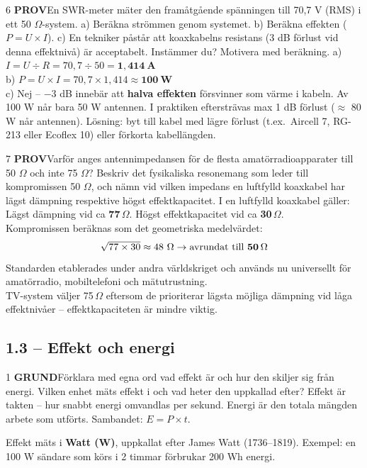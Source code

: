 \documentclass[a4paper,11pt,twoside]{book}
\newcommand{\qgrund}{\colorbox{greenpale}{\textcolor{greendark}{\headingfont\bfseries\tiny GRUND}}}
\newcommand{\qprov}{\colorbox{redpale}{\textcolor{reddark}{\headingfont\bfseries\tiny PROV}}}
\begin{document}
\begin{facitblock}{6}
\qprov\quad En SWR-meter mäter den framåtgående spänningen till 70,7 V 
(RMS) i ett 50 $\Omega$-system. a) Beräkna strömmen genom systemet. 
b) Beräkna effekten ($P = U \times I$). c) En tekniker påstår att 
koaxkabelns resistans (3 dB förlust vid denna effektnivå) är 
acceptabelt. Instämmer du? Motivera med beräkning.
\tcblower
a) $I = U \div R = 70{,}7 \div 50 = \mathbf{1{,}414\ \text{A}}$\\
b) $P = U \times I = 70{,}7 \times 1{,}414 \approx \mathbf{100\ \text{W}}$\\
c) Nej – $-3$ dB innebär att \textbf{halva effekten} försvinner som 
värme i kabeln. Av 100 W når bara 50 W antennen. I praktiken eftersträvas 
max 1 dB förlust ($\approx$ 80 W når antennen). Lösning: byt till kabel 
med lägre förlust (t.ex.\ Aircell 7, RG-213 eller Ecoflex 10) eller 
förkorta kabellängden.
\end{facitblock}

\newpage

\begin{facitblock}{7}
\qprov\quad Varför anges antennimpedansen för de flesta 
amatörradioapparater till 50 $\Omega$ och inte 75 $\Omega$? Beskriv 
det fysikaliska resonemang som leder till kompromissen 50 $\Omega$, 
och nämn vid vilken impedans en luftfylld koaxkabel har lägst dämpning 
respektive högst effektkapacitet.
\tcblower
I en luftfylld koaxkabel gäller:\\
Lägst dämpning vid ca \textbf{77\,$\Omega$}. Högst effektkapacitet vid 
ca \textbf{30\,$\Omega$}.\\[4pt]
Kompromissen beräknas som det geometriska medelvärdet:
\[ \sqrt{77 \times 30} \approx 48\ \Omega \rightarrow 
\text{avrundat till \textbf{50\,$\Omega$}} \]
Standarden etablerades under andra världskriget och används nu 
universellt för amatörradio, mobiltelefoni och mätutrustning.\\[4pt]
TV-system väljer 75\,$\Omega$ eftersom de prioriterar lägsta möjliga 
dämpning vid låga effektnivåer – effektkapaciteten är mindre viktig.
\end{facitblock}

\subsection*{1.3 – Effekt och energi}

\begin{facitblock}{1}
\qgrund\quad Förklara med egna ord vad effekt är och hur den skiljer sig från energi. Vilken enhet mäts effekt i och vad heter den uppkallad efter?
\tcblower
Effekt är takten – hur snabbt energi omvandlas per sekund. Energi är den totala mängden arbete som utförts. Sambandet: $E = P \times t$.

Effekt mäts i \textbf{Watt (W)}, uppkallat efter James Watt (1736–1819). Exempel: en 100 W sändare som körs i 2 timmar förbrukar 200 Wh energi.
\end{facitblock}
\end{document}
